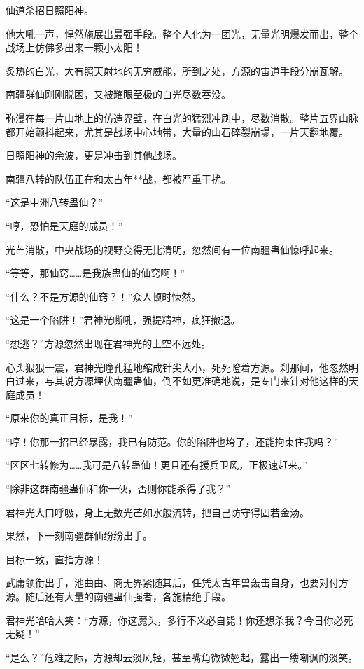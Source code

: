 \begin{this_body}
仙道杀招日照阳神。

他大吼一声，悍然施展出最强手段。整个人化为一团光，无量光明爆发而出，整个战场上仿佛多出来一颗小太阳！

炙热的白光，大有照天射地的无穷威能，所到之处，方源的宙道手段分崩瓦解。

南疆群仙刚刚脱困，又被耀眼至极的白光尽数吞没。

弥漫在每一片山地上的仿造界壁，在白光的猛烈冲刷中，尽数消散。整片五界山脉都开始颤抖起来，尤其是战场中心地带，大量的山石碎裂崩塌，一片天翻地覆。

日照阳神的余波，更是冲击到其他战场。

南疆八转的队伍正在和太古年**战，都被严重干扰。

“这是中洲八转蛊仙？”

“哼，恐怕是天庭的成员！”

光芒消散，中央战场的视野变得无比清明，忽然间有一位南疆蛊仙惊呼起来。

“等等，那仙窍……是我族蛊仙的仙窍啊！”

“什么？不是方源的仙窍？！”众人顿时悚然。

“这是一个陷阱！”君神光嘶吼，强提精神，疯狂撤退。

“想逃？”方源忽然出现在君神光的上空不远处。

心头狠狠一震，君神光瞳孔猛地缩成针尖大小，死死瞪着方源。刹那间，他忽然明白过来，与其说方源埋伏南疆蛊仙，倒不如更准确地说，是专门来针对他这样的天庭成员！

“原来你的真正目标，是我！”

“哼！你那一招已经暴露，我已有防范。你的陷阱也垮了，还能拘束住我吗？”

“区区七转修为……我可是八转蛊仙！更且还有援兵卫风，正极速赶来。”

“除非这群南疆蛊仙和你一伙，否则你能杀得了我？”

君神光大口呼吸，身上无数光芒如水般流转，把自己防守得固若金汤。

果然，下一刻南疆群仙纷纷出手。

目标一致，直指方源！

武庸领衔出手，池曲由、商无界紧随其后，任凭太古年兽轰击自身，也要对付方源。随后还有大量的南疆蛊仙强者，各施精绝手段。

君神光哈哈大笑：“方源，你这魔头，多行不义必自毙！你还想杀我？今日你必死无疑！”

“是么？”危难之际，方源却云淡风轻，甚至嘴角微微翘起，露出一缕嘲讽的淡笑。


\end{this_body}
